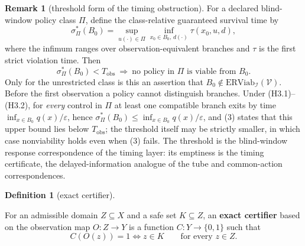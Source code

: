 \documentclass[11pt]{article}
\theoremstyle{definition}
\newtheorem{remark}{Remark}
\newtheorem{definition}{Definition}
\begin{document}
\begin{remark}[threshold form of the timing obstruction]\label{rem:sigma}
For a declared blind-window policy class \(\Pi\), define the
class-relative guaranteed survival time by
\[\sigma^*_{\Pi}(B_0)=\sup_{u(\cdot)\in\Pi}
\inf_{x_0\in B_0,\,d(\cdot)}\tau(x_0,u,d),\]
where the infimum ranges over observation-equivalent branches and
\(\tau\) is the first strict violation time. Then
\[\sigma^*_{\Pi}(B_0)<T_{\mathrm{obs}}\ \Longrightarrow\
\text{no policy in }\Pi\text{ is viable from }B_0.\]
Only for the unrestricted class is this an assertion that
\(B_0\notin\mathrm{ERViab}_{\mathcal I}(\mathcal V)\).
Before the first observation a policy cannot distinguish branches.
Under (H3.1)--(H3.2), for \emph{every} control in \(\Pi\) at least
one compatible branch exits by time
\(\inf_{x\in B_0}q(x)/\varepsilon\), hence
\(\sigma^*_{\Pi}(B_0)\le\inf_{x\in B_0}q(x)/\varepsilon\), and (3) states that
this upper bound lies below \(T_{\mathrm{obs}}\); the threshold itself
may be strictly smaller, in which case nonviability holds even when (3)
fails. The threshold is the blind-window response correspondence of the
timing layer: its emptiness is the timing certificate, the
delayed-information analogue of the tube and common-action
correspondences.
\end{remark}

\begin{definition}[exact certifier]\label{def:certifier}

For an admissible domain
\(Z \subseteq X\) and a safe set \(K \subseteq Z\), an \textbf{exact
certifier} based on the observation map \(O : Z \to Y\) is a function
\(C : Y \to \{0,1\}\) such that
\[C(O(z)) = 1 \iff z \in K \qquad \text{for every } z \in Z.\]

\end{definition}
\end{document}
